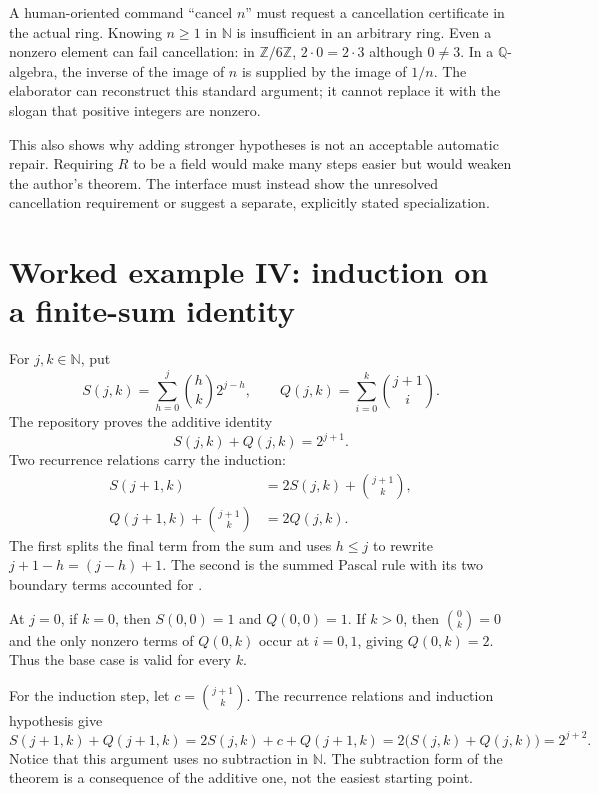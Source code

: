 \documentclass[11pt,a4paper]{article}
\newcommand{\NN}{\mathbb N}
\newcommand{\ZZ}{\mathbb Z}
\newcommand{\QQ}{\mathbb Q}
\begin{document}
A human-oriented command ``cancel $n$'' must request a cancellation certificate in the actual ring. Knowing $n\ge1$ in $\NN$ is insufficient in an arbitrary ring. Even a nonzero element can fail cancellation: in $\ZZ/6\ZZ$, $2\cdot0=2\cdot3$ although $0\ne3$. In a $\QQ$-algebra, the inverse of the image of $n$ is supplied by the image of $1/n$. The elaborator can reconstruct this standard argument; it cannot replace it with the slogan that positive integers are nonzero.

This also shows why adding stronger hypotheses is not an acceptable automatic repair. Requiring $R$ to be a field would make many steps easier but would weaken the author's theorem. The interface must instead show the unresolved cancellation requirement or suggest a separate, explicitly stated specialization.

\section{Worked example IV: induction on a finite-sum identity}
\label{sec:pascal}

For $j,k\in\NN$, put
\[
 S(j,k)=\sum_{h=0}^{j}\binom hk2^{j-h},
 \qquad Q(j,k)=\sum_{i=0}^{k}\binom{j+1}{i}.
\]
The repository proves the additive identity
\begin{equation}
 S(j,k)+Q(j,k)=2^{j+1}.
 \label{eq:pascal}
\end{equation}
Two recurrence relations carry the induction:
\begin{align}
 S(j+1,k)&=2S(j,k)+\binom{j+1}{k},\label{eq:Srec}\\
 Q(j+1,k)+\binom{j+1}{k}&=2Q(j,k).\label{eq:Qrec}
\end{align}
The first splits the final term from the sum and uses $h\le j$ to rewrite $j+1-h=(j-h)+1$. The second is the summed Pascal rule with its two boundary terms accounted for \cite{srcpascal}.

At $j=0$, if $k=0$, then $S(0,0)=1$ and $Q(0,0)=1$. If $k>0$, then $\binom0k=0$ and the only nonzero terms of $Q(0,k)$ occur at $i=0,1$, giving $Q(0,k)=2$. Thus the base case is valid for every $k$.

For the induction step, let $c=\binom{j+1}{k}$. The recurrence relations and induction hypothesis give
\[
 S(j+1,k)+Q(j+1,k)
 =2S(j,k)+c+Q(j+1,k)
 =2\bigl(S(j,k)+Q(j,k)\bigr)=2^{j+2}.
\]
Notice that this argument uses no subtraction in $\NN$. The subtraction form of the theorem is a consequence of the additive one, not the easiest starting point.
\end{document}
